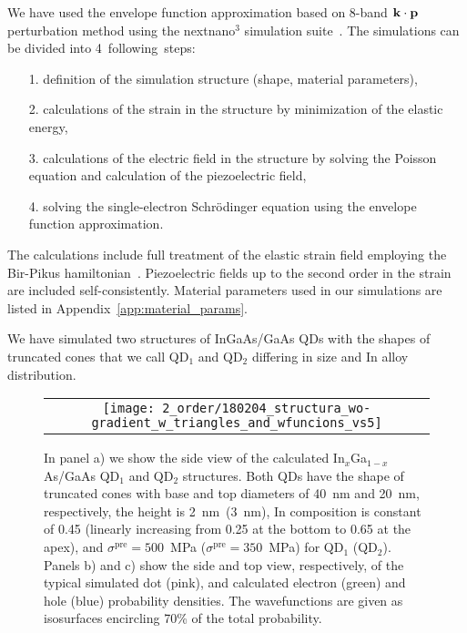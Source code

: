 %
We have used the envelope function approximation based on 8-band ${\bf k}\cdot{\bf p}$ perturbation method using the nextnano$^3$ simulation suite~\cite{Birner:07}. The simulations can be divided into 4~following~steps:
%
\begin{itemize}
	\item [1.] definition of the simulation structure (shape, material parameters),
	\item[2.] calculations of the strain in the structure by minimization of the elastic energy,
	\item[3.] calculations of the electric field in the structure by solving the Poisson equation and calculation of the piezoelectric field,
	\item[4.] solving the single-electron Schrödinger equation using the envelope function approximation.
\end{itemize}
%
The calculations include full treatment of the elastic strain field employing the Bir-Pikus hamiltonian~\cite{BirPik}. Piezoelectric fields up to the second order in the strain are included self-consistently. Material parameters used in our simulations are listed in Appendix~\ref{app:material_params}. 





We have simulated two structures of InGaAs/GaAs QDs with the shapes of truncated cones that we call QD$_1$ and QD$_2$ differing in size and In alloy distribution.
%
\begin{figure}[!ht]
	\renewcommand{\tabcolsep}{2pt}
	\begin{center}
		\begin{tabular}{c}
			\texttt{[image: 2\_order/180204\_structura\_wo-gradient\_w\_triangles\_and\_wfuncions\_vs5]} \\ 
		\end{tabular}
	\end{center}
	\caption{In panel a) we show the side view of the calculated In$_{{x}}$Ga$_{1-x}$As/GaAs QD$_1$ and QD$_2$ structures. Both QDs have the shape of truncated cones with base and top diameters of 40~nm and 20~nm, respectively, the height is 2~nm~(3~nm), In composition is constant of 0.45 (linearly increasing from 0.25 at the bottom to 0.65 at the apex), and $\sigma^\text{pre}=500$~MPa ($\sigma^\text{pre}=350$~MPa) for QD$_1$ (QD$_2$). Panels b) and c) show the side and top view, respectively, of the typical simulated dot (pink), and calculated electron (green) and hole (blue) probability densities. The wavefunctions are given as isosurfaces encircling 70\% of the total probability.
		\label{fig:2order:QDStruct}}
\end{figure}

